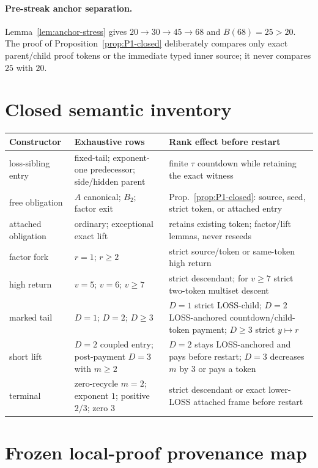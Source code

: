 \documentclass[11pt]{article}
\begin{document}
\paragraph{Pre-streak anchor separation.}
Lemma~\ref{lem:anchor-stress} gives
$20\to30\to45\to68$ and $B(68)=25>20$.  The proof of
Proposition~\ref{prop:P1-closed} deliberately compares only exact parent/child
proof tokens or the immediate typed inner source; it never compares $25$ with
$20$.

\section{Closed semantic inventory}\label{app:inventory}

\begin{center}
\small
\begin{tabular}{@{}p{.22\linewidth}p{.31\linewidth}p{.37\linewidth}@{}}
\toprule
Constructor & Exhaustive rows & Rank effect before restart \\
\midrule
loss-sibling entry & fixed-tail; exponent-one predecessor; side/hidden parent &
finite $\tau$ countdown while retaining the exact witness \\
free obligation & $A$ canonical; $B_2$; factor exit &
Prop.~\ref{prop:P1-closed}: source, seed, strict token, or attached entry \\
attached obligation & ordinary; exceptional exact lift &
retains existing token; factor/lift lemmas, never reseeds \\
factor fork & $r=1$; $r\ge2$ &
strict source/token or same-token high return \\
high return & $v=5$; $v=6$; $v\ge7$ &
strict descendant; for $v\ge7$ strict two-token multiset descent \\
marked tail & $D=1$; $D=2$; $D\ge3$ &
$D=1$ strict LOSS-child; $D=2$ LOSS-anchored countdown/child-token payment; $D\ge3$ strict $y\mapsto r$ \\
short lift & $D=2$ coupled entry; post-payment $D=3$ with $m\ge2$ &
$D=2$ stays LOSS-anchored and pays before restart; $D=3$ decreases $m$ by $3$ or pays a token \\
terminal & zero-recycle $m=2$; exponent $1$; positive $2/3$; zero $3$ &
strict descendant or exact lower-LOSS attached frame before restart \\
\bottomrule
\end{tabular}
\end{center}

\section{Frozen local-proof provenance map}
\end{document}
